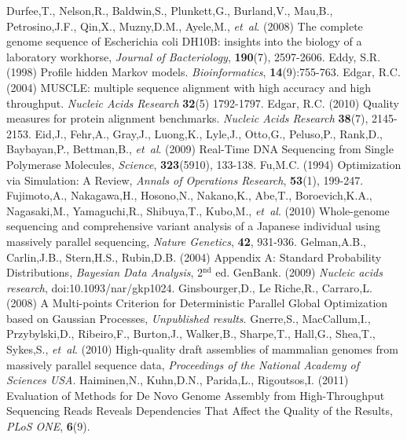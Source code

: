 \begin{thebibliography}{}
 Durfee,T., Nelson,R., Baldwin,S., Plunkett,G., Burland,V., Mau,B., Petrosino,J.F., Qin,X., Muzny,D.M., Ayele,M., {\it et~al}. (2008) The complete genome sequence of Escherichia coli DH10B: insights into the biology of a laboratory workhorse, {\it Journal of Bacteriology}, {\bf 190}(7), 2597-2606.
 Eddy, S.R. (1998) Profile hidden Markov models. \textit{Bioinformatics}, \textbf{14}(9):755-763.
Edgar, R.C. (2004) MUSCLE: multiple sequence alignment with high accuracy and high throughput. \textit{Nucleic Acids Research} \textbf{32}(5) 1792-1797.
Edgar, R.C. (2010) Quality measures for protein alignment benchmarks. \textit{Nucleic Acids Research} \textbf{38}(7), 2145-2153.
 Eid,J., Fehr,A., Gray,J., Luong,K., Lyle,J., Otto,G., Peluso,P., Rank,D., Baybayan,P., Bettman,B., {\it et~al}. (2009) Real-Time DNA Sequencing from Single Polymerase Molecules, {\it Science}, {\bf 323}(5910), 133-138.
 Fu,M.C. (1994) Optimization via Simulation: A Review, {\it Annals of Operations Research}, {\bf 53}(1), 199-247.
 Fujimoto,A., Nakagawa,H., Hosono,N., Nakano,K., Abe,T., Boroevich,K.A., Nagasaki,M., Yamaguchi,R., Shibuya,T., Kubo,M., {\it et~al}. (2010) Whole-genome sequencing and comprehensive variant analysis of a Japanese individual using massively parallel sequencing, {\it Nature Genetics}, {\bf 42}, 931-936.
 Gelman,A.B., Carlin,J.B., Stern,H.S., Rubin,D.B. (2004) Appendix A: Standard Probability Distributions, {\it Bayesian Data Analysis}, 2$^{\text{nd}}$ ed.
GenBank. (2009) \textit{Nucleic acids research}, doi:10.1093/nar/gkp1024.
 Ginsbourger,D., Le Riche,R., Carraro,L. (2008) A Multi-points Criterion for Deterministic Parallel Global Optimization based on Gaussian Processes, {\it Unpublished results}.
 Gnerre,S., MacCallum,I., Przybylski,D., Ribeiro,F., Burton,J., Walker,B., Sharpe,T., Hall,G., Shea,T., Sykes,S., {\it et~al}. (2010) High-quality draft assemblies of mammalian genomes from massively parallel sequence data, {\it Proceedings of the National Academy of Sciences USA}.
 Haiminen,N., Kuhn,D.N., Parida,L., Rigoutsos,I. (2011) Evaluation of Methods for De Novo Genome Assembly from High-Throughput Sequencing Reads Reveals Dependencies That Affect the Quality of the Results, {\it PLoS ONE}, {\bf 6}(9).

\end{thebibliography}
